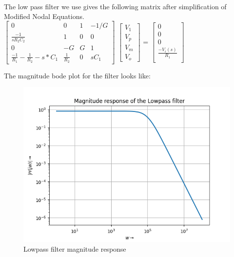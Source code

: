 \documentclass{article}
\begin{document}
The low pass filter we use gives the following matrix after simplification of Modified Nodal Equations.
\\
$\begin{bmatrix}
    0   & 0 & 1  & -1/G \\
    \frac{-1}{sR_2C_2}  & 1 & 0 & 0\\
    0  & -G & G & 1 \\
    \frac{-1}{R_1} - \frac{1}{R_2} - s*C_1 & \frac{1}{R_2} & 0 & sC_1
\end{bmatrix}$
$\begin{bmatrix}
    V_1\\
    V_p\\
    V_m \\
    V_o
\end{bmatrix}$
=
$\begin{bmatrix}
    0 \\
    0 \\
    0 \\
    \frac{-V_i(s)}{R_1} \\
    
\end{bmatrix}$
\lstset{language=Python}
\lstset{frame=lines}
\lstset{basicstyle=\footnotesize}
\newline
\newline


The magnitude bode plot for the filter looks like:
\begin{figure}[h!]
\centering
\includegraphics[scale=0.5]{Figure_1.png}
\caption{Lowpass filter magnitude response}
\label{fig:Lowpass filter magnitude response}
\end{figure}
\end{document}
